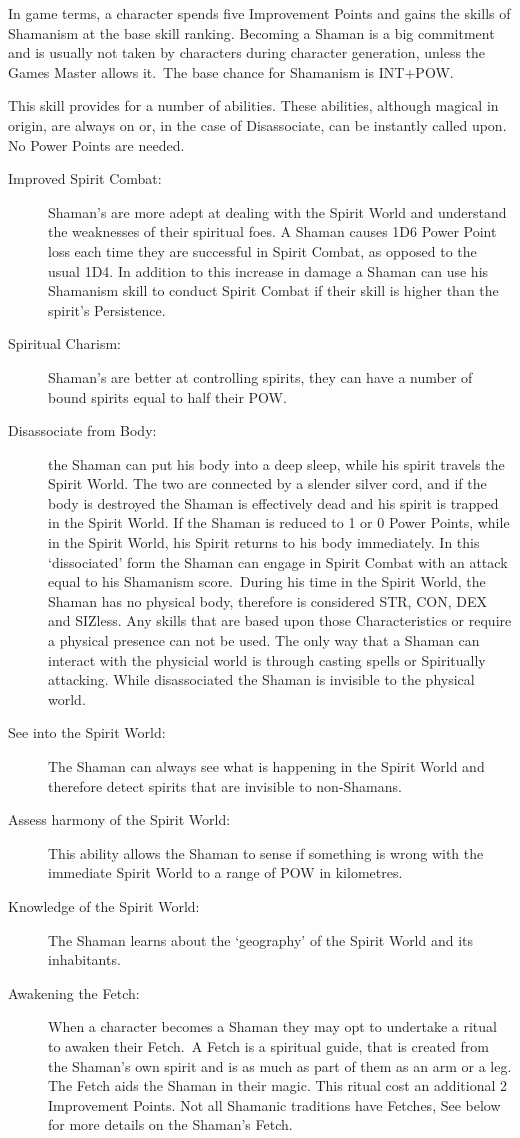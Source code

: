 In game terms, a character spends five Improvement Points and gains the skills of Shamanism at the base skill ranking. Becoming a Shaman is a big commitment and is usually not taken by characters during character generation, unless the Games Master allows it. The base chance for Shamanism is INT+POW.

This skill provides for a number of abilities. These abilities, although magical in origin, are always on or, in the case of Disassociate, can be instantly called upon. No Power Points are needed.

\begin{description}
\item[Improved Spirit Combat:] Shaman’s are more adept at dealing with the Spirit World and understand the weaknesses of their spiritual foes. A Shaman causes 1D6 Power Point loss each time they are successful in Spirit Combat, as opposed to the usual 1D4. In addition to this increase in damage a Shaman can use his Shamanism skill to conduct Spirit Combat if their skill is higher than the spirit’s Persistence.
\item[Spiritual Charism:] Shaman’s are better at controlling spirits, they can have a number of bound spirits equal to half their POW.
\item[Disassociate from Body:] the Shaman can put his body into a deep sleep, while his spirit travels the Spirit World. The two are connected by a slender silver cord, and if the body is destroyed the Shaman is effectively dead and his spirit is trapped in the Spirit World. If the Shaman is reduced to 1 or 0 Power Points, while in the Spirit World, his Spirit returns to his body immediately. In this ‘dissociated’ form the Shaman can engage in Spirit Combat with an attack equal to his Shamanism score. During his time in the Spirit World, the Shaman has no physical body, therefore is considered STR, CON, DEX and SIZless. Any skills that are based upon those Characteristics or require a physical presence can not be used. The only way that a Shaman can interact with the physicial world is through casting spells or Spiritually attacking. While disassociated the Shaman is invisible to the physical world.
\item[See into the Spirit World:] The Shaman can always see what is happening in the Spirit World and therefore detect spirits that are invisible to non-Shamans.
\item[Assess harmony of the Spirit World:] This ability allows the Shaman to sense if something is wrong with the immediate Spirit World to a range of POW in kilometres. 
\item[Knowledge of the Spirit World:] The Shaman learns about the ‘geography’ of the Spirit World and its inhabitants.
\item[Awakening the Fetch:] When a character becomes a Shaman they may opt to undertake a ritual to awaken their Fetch. A Fetch is a spiritual guide, that is created from the Shaman’s own spirit and is as much as part of them as an arm or a leg. The Fetch aids the Shaman in their magic. This ritual cost an additional 2 Improvement Points. Not all Shamanic traditions have Fetches, See below for more details on the Shaman’s Fetch.  
\end{description}


